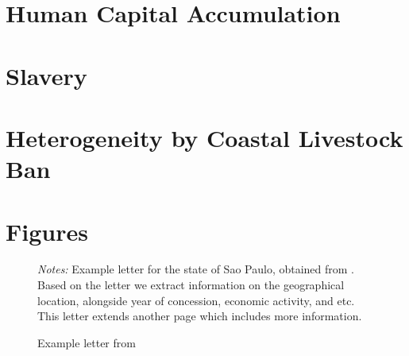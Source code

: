 \documentclass{article}
\begin{document}
%

\clearpage



\clearpage

\section*{Human Capital Accumulation}







\clearpage 

\section*{Slavery}


\clearpage

\section*{Heterogeneity by Coastal Livestock Ban}



\appendix

\setcounter{figure}{0}  
\setcounter{table}{0}  

\renewcommand{\thefigure}{A.\arabic{figure}}
\renewcommand{\thetable}{A.\arabic{table}}

\section{Figures}

\begin{figure}[h!]
  \begin{center}
  \caption{Example letter from \textcite{noauthor_1921-qd}}
  \label{fig:example_letter_sp}
  \vspace{3mm}
  \end{center}
  \textit{Notes:} Example letter for the state of Sao Paulo, obtained from \textcite[p.~47]{noauthor_1921-qd}. Based on the letter we extract information on the geographical location, alongside year of concession, economic activity, and etc. This letter extends another page which includes more information.
\end{figure}
\end{document}
